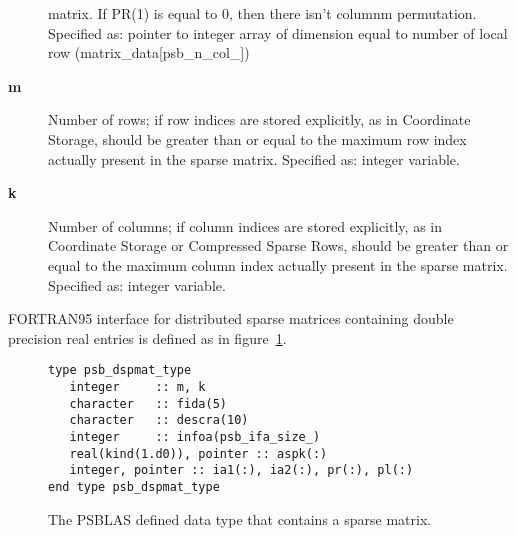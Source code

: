 \begin{description}
matrix. If PR(1) is equal to 0, then there isn't columnm permutation.\\
Specified as: pointer to integer array of dimension equal to number of
local row (matrix\_data[psb\_n\_col\_\hbox{]})
\item[{\bf m}] Number of rows; if row indices are stored explicitly,
as in Coordinate Storage, should be greater than or equal to the
maximum row index actually present in the sparse matrix.
Specified as: integer variable.
\item[{\bf k}] Number of columns; if column indices are stored explicitly,
as in Coordinate Storage or Compressed Sparse Rows, should be greater
than or equal to the maximum column  index actually present in the sparse matrix.
Specified as: integer variable.
\end{description}
FORTRAN95 interface for distributed sparse matrices containing double precision
real entries is defined as in figure~\ref{fig:spmattype}.
\begin{figure}[h!]
  \begin{Sbox}
    \begin{minipage}[tl]{0.85\textwidth}
\begin{verbatim}
type psb_dspmat_type
   integer     :: m, k
   character   :: fida(5)
   character   :: descra(10)
   integer     :: infoa(psb_ifa_size_)
   real(kind(1.d0)), pointer :: aspk(:)
   integer, pointer :: ia1(:), ia2(:), pr(:), pl(:)
end type psb_dspmat_type
\end{verbatim}
    \end{minipage}
  \end{Sbox}
  \setlength{\fboxsep}{8pt}
  \begin{center}
    \fbox{\TheSbox}
  \end{center}
  \caption{\label{fig:spmattype} 
    The PSBLAS defined data type that
    contains a sparse matrix.} 
\end{figure}

